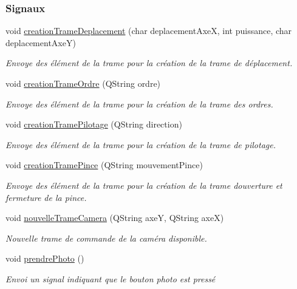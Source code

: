 \subsubsection*{Signaux}
\begin{DoxyCompactItemize}
\item 
void \hyperlink{class_manette_a4151ee98538d58d2dde6c8027e9ef512}{creation\+Trame\+Deplacement} (char deplacement\+AxeX, int puissance, char deplacement\+AxeY)
\begin{DoxyCompactList}\small\item\em Envoye des élément de la trame pour la création de la trame de déplacement. \end{DoxyCompactList}\item 
void \hyperlink{class_manette_ad28d8f539df6b73805ae94e9bbd827ec}{creation\+Trame\+Ordre} (Q\+String ordre)
\begin{DoxyCompactList}\small\item\em Envoye des élément de la trame pour la création de la trame des ordres. \end{DoxyCompactList}\item 
void \hyperlink{class_manette_a39de9cbde743771debc15501f8f8c154}{creation\+Trame\+Pilotage} (Q\+String direction)
\begin{DoxyCompactList}\small\item\em Envoye des élément de la trame pour la création de la trame de pilotage. \end{DoxyCompactList}\item 
void \hyperlink{class_manette_a16cb602cf7001f78b115f395fad47586}{creation\+Trame\+Pince} (Q\+String mouvement\+Pince)
\begin{DoxyCompactList}\small\item\em Envoye des élément de la trame pour la création de la trame d\textquotesingle{}ouverture et fermeture de la pince. \end{DoxyCompactList}\item 
void \hyperlink{class_manette_a229a449e851b5f716778d19c5cf2ba49}{nouvelle\+Trame\+Camera} (Q\+String axeY, Q\+String axeX)
\begin{DoxyCompactList}\small\item\em Nouvelle trame de commande de la caméra disponible. \end{DoxyCompactList}\item 
void \hyperlink{class_manette_a34d2a8b73a0913ef361d64f60e5d0eac}{prendre\+Photo} ()
\begin{DoxyCompactList}\small\item\em Envoi un signal indiquant que le bouton photo est pressé \end{DoxyCompactList}\end{DoxyCompactItemize}
